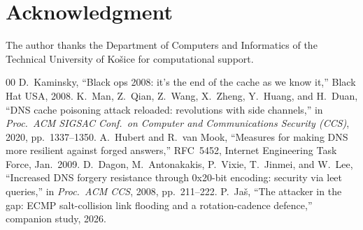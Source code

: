\documentclass[conference]{IEEEtran}
\begin{document}
\section*{Acknowledgment}

The author thanks the Department of Computers and Informatics of the Technical University of Ko\v{s}ice
for computational support.

\begin{thebibliography}{00}
 D.~Kaminsky, ``Black ops 2008: it's the end of the cache as we know it,'' Black Hat
USA, 2008.
 K.~Man, Z.~Qian, Z.~Wang, X.~Zheng, Y.~Huang, and H.~Duan, ``DNS cache poisoning attack
reloaded: revolutions with side channels,'' in \emph{Proc.\ ACM SIGSAC Conf.\ on Computer and
Communications Security (CCS)}, 2020, pp.~1337--1350.
 A.~Hubert and R.~van Mook, ``Measures for making DNS more resilient against forged
answers,'' RFC~5452, Internet Engineering Task Force, Jan.\ 2009.
 D.~Dagon, M.~Antonakakis, P.~Vixie, T.~Jinmei, and W.~Lee, ``Increased DNS forgery
resistance through 0x20-bit encoding: security via leet queries,'' in \emph{Proc.\ ACM CCS}, 2008,
pp.~211--222.
 P.~Ja\v{s}, ``The attacker in the gap: ECMP salt-collision link flooding and a
rotation-cadence defence,'' companion study, 2026.
\end{thebibliography}
\end{document}
